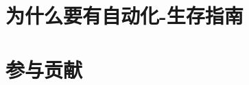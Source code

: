 \frontmatter

\chapter{为什么要有自动化-生存指南}

\chapter{参与贡献}

\clearpage
{
  \hypersetup{hidelinks}
  \tableofcontents
}

\mainmatter
